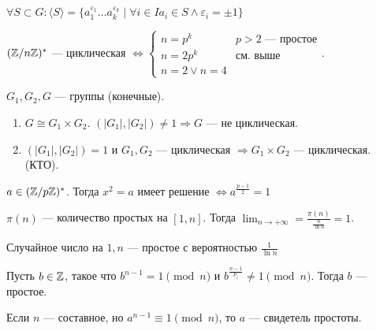  \begin{theorem}
     $\forall S \subset G\!: \langle S \rangle= \{a_1^{\varepsilon_1} \ldots a_k^{\varepsilon_k} \mid \forall i \in I a_i \in S \land \varepsilon_i = \pm 1\}$
 \end{theorem}
  \begin{theorem}
      $(\mathbb{Z} / n\mathbb{Z})^*$ --- циклическая  $\iff \begin{cases} n=p^k & p>2\text{ --- простое} \\ n = 2 p^k & \text{см. выше} \\ n = 2 \lor n = 4\end{cases}$.
 \end{theorem}
    \begin{statement}
    $G_1, G_2, G$ --- группы (конечные). 
    \begin{enumerate}
        \item $G \cong G_1 \times G_2$. $(|G_1|, |G_2|) \neq 1 \Rightarrow G$ --- не циклическая.
        \item $(|G_1|, |G_2|) = 1$ и $G_1, G_2$ --- циклическая $\Rightarrow G_1 \times G_2$ --- циклическая. (КТО).
    \end{enumerate}
    \end{statement}
\begin{theorem}
    $a \in (\mathbb{Z} / p \mathbb{Z})^*$. Тогда  $x^2 = a$ имеет решение  $\iff a^{\frac{p-1}{2}} = 1$
\end{theorem}
 \begin{theorem}
     $\pi(n)$ --- количество простых на  $[1, n]$. Тогда  $\lim_{n \to +\infty} = \frac{\pi(n)}{\frac{n}{\ln n}} = 1$.
\end{theorem}
\begin{consequence}
   Случайное число на $1, n$ --- простое с вероятностью  $\frac{1}{\ln n}$ 
\end{consequence}
\begin{theorem}
Пусть  $b \in \mathbb{Z}$, такое что  $b^{n-1}= 1 \pmod{n}$ и  $b^{\frac{n-1}{p_i}} \neq 1 \pmod{n}$. Тогда $b$ --- простое.
\end{theorem}
 \begin{definition}
     Если $n$ --- составное, но  $a^{n-1} \equiv 1 \pmod{n}$, то  $a$ --- свидетель простоты.
\end{definition}

